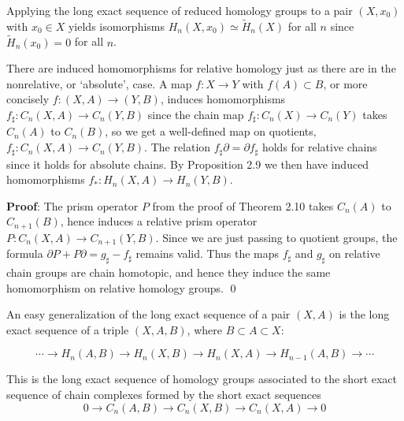 \begin{example}
\label{ex:reduced-homology-relative}
Applying the long exact sequence of reduced homology groups to a pair $(X,x_0)$ with $x_0 \in X$ yields isomorphisms $H_n(X,x_0) \simeq \tilde H_n(X)$ for all $n$ since $\tilde H_n(x_0) = 0$ for all $n$.
\end{example}

There are induced homomorphisms for relative homology just as there are in the nonrelative, or `absolute', case. A map $f:X\to Y$ with $f(A) \subset B$, or more concisely $f:(X,A)\to(Y,B)$, induces homomorphisms $f_\sharp:C_n(X,A)\to C_n(Y,B)$ since the chain map $f_\sharp:C_n(X)\to C_n(Y)$ takes $C_n(A)$ to $C_n(B)$, so we get a well-defined map on quotients, $f_\sharp:C_n(X,A)\to C_n(Y,B)$. The relation $f_\sharp\partial = \partial f_\sharp$ holds for relative chains since it holds for absolute chains. By Proposition 2.9 we then have induced homomorphisms $f_*:H_n(X,A)\to H_n(Y,B)$.

\begin{proposition}[If two maps $f,g:(X,A)\to(Y,B)$ are homotopic through maps of pairs $(X,A)\to(Y,B)$, then $f_* = g_*:H_n(X,A)\to H_n(Y,B)$]
\label{prop:homotopic-maps-pairs}

\end{proposition}\textbf{Proof}: The prism operator $P$ from the proof of Theorem 2.10 takes $C_n(A)$ to $C_{n+1}(B)$, hence induces a relative prism operator $P:C_n(X,A)\to C_{n+1}(Y,B)$. Since we are just passing to quotient groups, the formula $\partial P + P\partial = g_\sharp - f_\sharp$ remains valid. Thus the maps $f_\sharp$ and $g_\sharp$ on relative chain groups are chain homotopic, and hence they induce the same homomorphism on relative homology groups. \qed

An easy generalization of the long exact sequence of a pair $(X,A)$ is the long exact sequence of a triple $(X,A,B)$, where $B \subset A \subset X$:

\[
\cdots \to H_n(A,B) \to H_n(X,B) \to H_n(X,A) \to H_{n-1}(A,B) \to \cdots
\]

This is the long exact sequence of homology groups associated to the short exact sequence of chain complexes formed by the short exact sequences
\[
0 \to C_n(A,B) \to C_n(X,B) \to C_n(X,A) \to 0
\]

